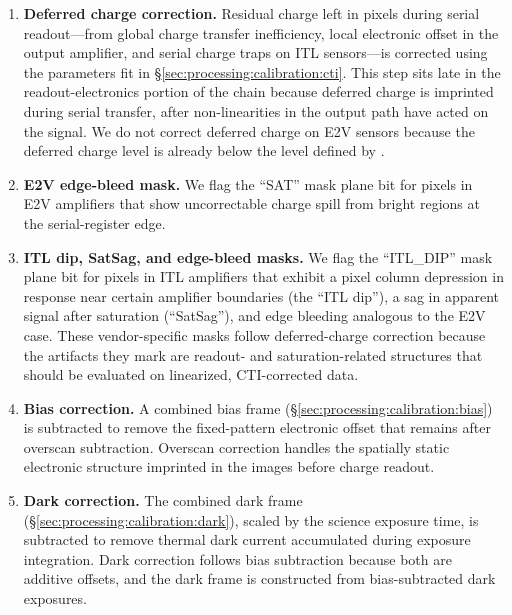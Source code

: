 \begin{enumerate}
    \item \textbf{Deferred charge correction.}
    Residual charge left in pixels during serial readout---from global charge transfer inefficiency, local electronic offset in the output amplifier, and serial charge traps on ITL sensors---is corrected using the parameters fit in \S\ref{sec:processing:calibration:cti}.
    This step sits late in the readout-electronics portion of the chain because deferred charge is imprinted during serial transfer, after non-linearities in the output path have acted on the signal.
    We do not correct deferred charge on E2V sensors because the deferred charge level is already below the level defined by \citet{LPM-17}.

    \item \textbf{E2V edge-bleed mask.}
    We flag the ``SAT'' mask plane bit for pixels in E2V amplifiers that show uncorrectable charge spill from bright regions at the serial-register edge.
    
    \item \textbf{ITL dip, SatSag, and edge-bleed masks.}
    We flag the ``ITL\_DIP'' mask plane bit for pixels in ITL amplifiers that exhibit a pixel column depression in response near certain amplifier boundaries (the ``ITL dip''), a sag in apparent signal after saturation (``SatSag''), and edge bleeding analogous to the E2V case.
    These vendor-specific masks follow deferred-charge correction because the artifacts they mark are readout- and saturation-related structures that should be evaluated on linearized, CTI-corrected data.

    \item \textbf{Bias correction.}
    A combined bias frame (\S\ref{sec:processing:calibration:bias}) is subtracted to remove the fixed-pattern electronic offset that remains after overscan subtraction.
    Overscan correction handles the spatially static electronic structure imprinted in the images before charge readout.

    \item \textbf{Dark correction.}
    The combined dark frame (\S\ref{sec:processing:calibration:dark}), scaled by the science exposure time, is subtracted to remove thermal dark current accumulated during exposure integration.
    Dark correction follows bias subtraction because both are additive offsets, and the dark frame is constructed from bias-subtracted dark exposures.


\end{enumerate}
